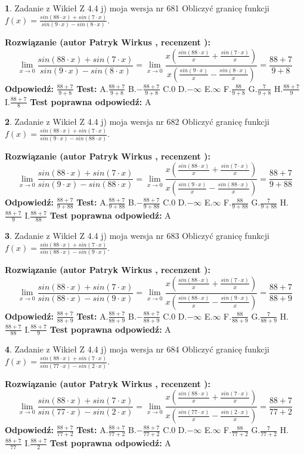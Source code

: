 \documentclass[12pt, a4paper]{article}
\theoremstyle{definition} %
\newtheorem{zad}{}
\newcommand{\zadStart}[1]{\begin{zad}#1\newline}
\newcommand{\zadStop}{\end{zad}}
\newcommand{\rozwStart}[2]{\noindent \textbf{Rozwiązanie (autor #1 , recenzent #2): }\newline}
\newcommand{\rozwStop}{\newline}
\newcommand{\odpStart}{\noindent \textbf{Odpowiedź:}\newline}
\newcommand{\odpStop}{\newline}
\newcommand{\testStart}{\noindent \textbf{Test:}\newline}
\newcommand{\testStop}{\newline}
\newcommand{\kluczStart}{\noindent \textbf{Test poprawna odpowiedź:}\newline}
\newcommand{\kluczStop}{\newline}
\begin{document}
\zadStart{Zadanie z Wikieł Z 4.4 j) moja wersja nr 681}
Obliczyć granicę funkcji $f(x)=\frac{sin(88\cdot x) +sin(7\cdot x)}{sin(9\cdot x) -sin(8\cdot x)}$.
\zadStop
\rozwStart{Patryk Wirkus}{}
$$\lim\limits_{x\to 0}\frac{sin(88\cdot x) +sin(7\cdot x)}{sin(9\cdot x) -sin(8\cdot x)}=\lim\limits_{x\to 0}\frac{x(\frac{sin(88\cdot x)}{x}+\frac{sin(7\cdot x)}{x})}{x(\frac{sin(9\cdot x)}{x}-\frac{sin(8\cdot x)}{x})}=\frac{88+7}{9+8}$$
\rozwStop
\odpStart
$\frac{88+7}{9+8}$
\odpStop
\testStart
A.$\frac{88+7}{9+8}$
B.$-\frac{88+7}{9+8}$
C.$0$
D.$-\infty$
E.$\infty$
F.$\frac{88}{9+8}$
G.$\frac{7}{9+8}$
H.$\frac{88+7}{9}$
I.$\frac{88+7}{8}$
\testStop
\kluczStart
A
\kluczStop



\zadStart{Zadanie z Wikieł Z 4.4 j) moja wersja nr 682}
Obliczyć granicę funkcji $f(x)=\frac{sin(88\cdot x) +sin(7\cdot x)}{sin(9\cdot x) -sin(88\cdot x)}$.
\zadStop
\rozwStart{Patryk Wirkus}{}
$$\lim\limits_{x\to 0}\frac{sin(88\cdot x) +sin(7\cdot x)}{sin(9\cdot x) -sin(88\cdot x)}=\lim\limits_{x\to 0}\frac{x(\frac{sin(88\cdot x)}{x}+\frac{sin(7\cdot x)}{x})}{x(\frac{sin(9\cdot x)}{x}-\frac{sin(88\cdot x)}{x})}=\frac{88+7}{9+88}$$
\rozwStop
\odpStart
$\frac{88+7}{9+88}$
\odpStop
\testStart
A.$\frac{88+7}{9+88}$
B.$-\frac{88+7}{9+88}$
C.$0$
D.$-\infty$
E.$\infty$
F.$\frac{88}{9+88}$
G.$\frac{7}{9+88}$
H.$\frac{88+7}{9}$
I.$\frac{88+7}{88}$
\testStop
\kluczStart
A
\kluczStop



\zadStart{Zadanie z Wikieł Z 4.4 j) moja wersja nr 683}
Obliczyć granicę funkcji $f(x)=\frac{sin(88\cdot x) +sin(7\cdot x)}{sin(88\cdot x) -sin(9\cdot x)}$.
\zadStop
\rozwStart{Patryk Wirkus}{}
$$\lim\limits_{x\to 0}\frac{sin(88\cdot x) +sin(7\cdot x)}{sin(88\cdot x) -sin(9\cdot x)}=\lim\limits_{x\to 0}\frac{x(\frac{sin(88\cdot x)}{x}+\frac{sin(7\cdot x)}{x})}{x(\frac{sin(88\cdot x)}{x}-\frac{sin(9\cdot x)}{x})}=\frac{88+7}{88+9}$$
\rozwStop
\odpStart
$\frac{88+7}{88+9}$
\odpStop
\testStart
A.$\frac{88+7}{88+9}$
B.$-\frac{88+7}{88+9}$
C.$0$
D.$-\infty$
E.$\infty$
F.$\frac{88}{88+9}$
G.$\frac{7}{88+9}$
H.$\frac{88+7}{88}$
I.$\frac{88+7}{9}$
\testStop
\kluczStart
A
\kluczStop



\zadStart{Zadanie z Wikieł Z 4.4 j) moja wersja nr 684}
Obliczyć granicę funkcji $f(x)=\frac{sin(88\cdot x) +sin(7\cdot x)}{sin(77\cdot x) -sin(2\cdot x)}$.
\zadStop
\rozwStart{Patryk Wirkus}{}
$$\lim\limits_{x\to 0}\frac{sin(88\cdot x) +sin(7\cdot x)}{sin(77\cdot x) -sin(2\cdot x)}=\lim\limits_{x\to 0}\frac{x(\frac{sin(88\cdot x)}{x}+\frac{sin(7\cdot x)}{x})}{x(\frac{sin(77\cdot x)}{x}-\frac{sin(2\cdot x)}{x})}=\frac{88+7}{77+2}$$
\rozwStop
\odpStart
$\frac{88+7}{77+2}$
\odpStop
\testStart
A.$\frac{88+7}{77+2}$
B.$-\frac{88+7}{77+2}$
C.$0$
D.$-\infty$
E.$\infty$
F.$\frac{88}{77+2}$
G.$\frac{7}{77+2}$
H.$\frac{88+7}{77}$
I.$\frac{88+7}{2}$
\testStop
\kluczStart
A
\kluczStop
\end{document}
